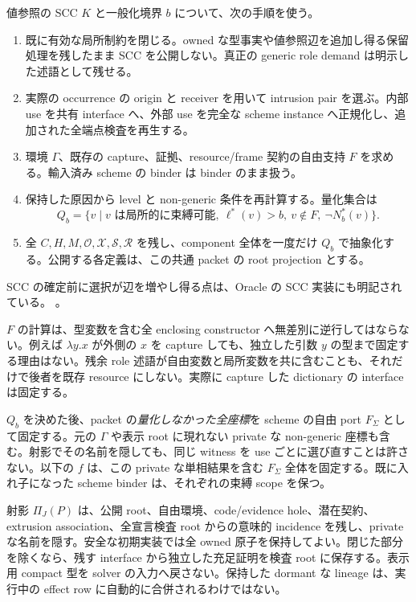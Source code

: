 \documentclass[11pt,a4paper]{article}
\theoremstyle{remark}
\newcommand{\src}[2]{\href{https://github.com/momota1029/yulang/blob/a58eefc31e22141574b6f20c6a5748151c6d79f1/#1}{\detokenize{#2}}}
\begin{document}
値参照の SCC $K$ と一般化境界 $b$ について、次の手順を使う。
\begin{enumerate}
\item 既に有効な局所制約を閉じる。owned な型事実や値参照辺を追加し得る保留処理を残したまま SCC を公開しない。真正の generic role demand は明示した述語として残せる。
\item 実際の occurrence の origin と receiver を用いて intrusion pair を選ぶ。内部 use を共有 interface へ、外部 use を完全な scheme instance へ正規化し、追加された全端点検査を再生する。
\item 環境 $\Gamma$、既存の capture、証拠、resource/frame 契約の自由支持 $F$ を求める。輸入済み scheme の binder は binder のまま扱う。
\item 保持した原因から level と non-generic 条件を再計算する。量化集合は
\[
 Q_b=\{v\mid v\text{ は局所的に束縛可能},\ 
       \ell^*(v)>b,\ v\notin F,\ \neg N_b^*(v)\}.
\]
\item 全 $C,H,M,\mathcal O,\mathcal X,\mathcal S,\mathcal R$ を残し、component 全体を一度だけ $Q_b$ で抽象化する。公開する各定義は、この共通 packet の root projection とする。
\end{enumerate}
SCC の確定前に選択が辺を増やし得る点は、Oracle の SCC 実装にも明記されている。
\src{crates/infer/src/scc.rs\#L1-L27}{選択と SCC の確定時機}。

$F$ の計算は、型変数を含む全 enclosing constructor へ無差別に逆行してはならない。例えば $\lambda y.x$ が外側の $x$ を capture しても、独立した引数 $y$ の型まで固定する理由はない。残余 role 述語が自由変数と局所変数を共に含むことも、それだけで後者を既存 resource にしない。実際に capture した dictionary の interface は固定する。

$Q_b$ を決めた後、packet の\emph{量化しなかった全座標}を scheme の自由 port $F_\Sigma$ として固定する。元の $\Gamma$ や表示 root に現れない private な non-generic 座標も含む。射影でその名前を隠しても、同じ witness を use ごとに選び直すことは許さない。以下の $f$ は、この private な単相結果を含む $F_\Sigma$ 全体を固定する。既に入れ子になった scheme binder は、それぞれの束縛 scope を保つ。

射影 $\Pi_J(P)$ は、公開 root、自由環境、code/evidence hole、潜在契約、extrusion association、全宣言検査 root からの意味的 incidence を残し、private な名前を隠す。安全な初期実装では全 owned 原子を保持してよい。閉じた部分を除くなら、残す interface から独立した充足証明を検査 root に保存する。表示用 compact 型を solver の入力へ戻さない。保持した dormant な lineage は、実行中の effect row に自動的に合併されるわけではない。
\end{document}
